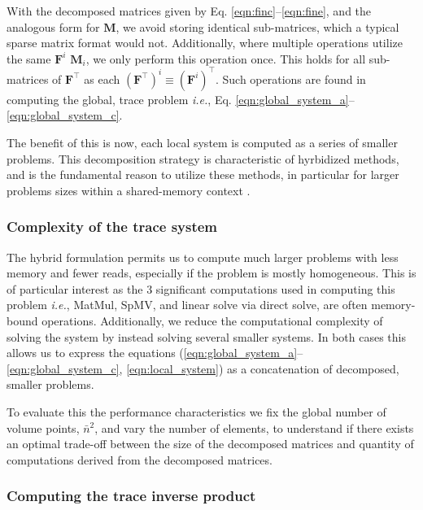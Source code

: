 %
%
%
\noindent
With the decomposed matrices given by Eq. \ref{eqn:finc}--\ref{eqn:fine}, and the analogous form for $\textbf{M}$, we avoid storing identical sub-matrices, which a typical sparse matrix format would not. 
Additionally, where multiple operations utilize the same $\textbf{F}^i$ $\textbf{M}_i$, we only perform this operation once. 
This holds for all sub-matrices of $\textbf{F}^\intercal$ as each $(\textbf{F}^\intercal)^i \equiv (\textbf{F}^i)^\intercal$.
Such operations are found in computing the global, trace problem \emph{i.e.}, Eq. \ref{eqn:global_system_a}--\ref{eqn:global_system_c}.

The benefit of this is now, each local system is computed as a series of smaller problems. 
This decomposition strategy is characteristic of hyrbidized methods, and is the fundamental reason to utilize these methods, in particular for larger problems sizes within a shared-memory context \citep{kozdon2021hybridized, kolev2021efficient, fernandez2017hybridized}. 

%
%
%
\subsubsection{Complexity of the trace system} 

The hybrid formulation permits us to compute much larger problems with less memory and fewer reads, especially if the problem is mostly homogeneous.
This is of particular interest as the 3 significant computations used in computing this problem \emph{i.e.}, MatMul, SpMV, and linear solve via direct solve, are often memory-bound operations. 
Additionally, we reduce the computational complexity of solving the system by instead solving several smaller systems. 
In both cases this allows us to express 
the equations (\ref{eqn:global_system_a}--\ref{eqn:global_system_c}, 
\ref{eqn:local_system}) as a concatenation of decomposed, smaller problems.

To evaluate this the performance characteristics we fix the global number of volume points, $\bar{n}^2$, and vary the number of elements, to understand if there exists an optimal trade-off between the size of the decomposed matrices and quantity of computations derived from the decomposed matrices.

%
%
%
\subsubsection{Computing the trace inverse product}

